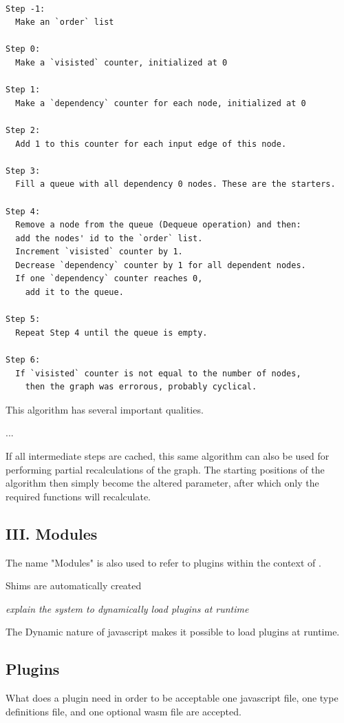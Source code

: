 \begin{lstlisting}

Step -1: 
  Make an `order` list

Step 0: 
  Make a `visisted` counter, initialized at 0

Step 1: 
  Make a `dependency` counter for each node, initialized at 0

Step 2: 
  Add 1 to this counter for each input edge of this node.

Step 3: 
  Fill a queue with all dependency 0 nodes. These are the starters.

Step 4: 
  Remove a node from the queue (Dequeue operation) and then:
  add the nodes' id to the `order` list.
  Increment `visisted` counter by 1.
  Decrease `dependency` counter by 1 for all dependent nodes.
  If one `dependency` counter reaches 0, 
    add it to the queue.

Step 5: 
  Repeat Step 4 until the queue is empty.

Step 6: 
  If `visisted` counter is not equal to the number of nodes, 
    then the graph was errorous, probably cyclical. 

\end{lstlisting}

This algorithm has several important qualities. 

...

If all intermediate steps are cached, this same algorithm can also be used for performing partial recalculations of the graph. 
The starting positions of the algorithm then simply become the altered parameter, after which only the required functions will recalculate. 


\subsection*{III. Modules} 


The name "Modules" is also used to refer to plugins within the context of \geofront{}.

Shims are automatically created

\emph{explain the system to dynamically load plugins at runtime}

The Dynamic nature of javascript makes it possible to load plugins at runtime. 

  

\subsection{Plugins}
What does a plugin need in order to be acceptable
one javascript file, one type definitions file, and one optional wasm file are accepted. 

